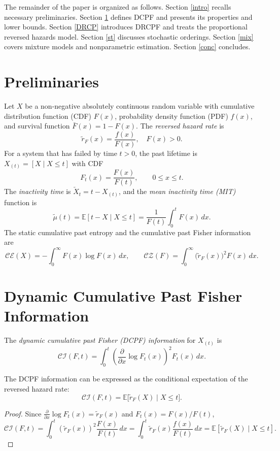 \documentclass[twoside]{article}
\begin{document}
The remainder of the paper is organized as follows. Section \ref{intro} recalls necessary preliminaries. Section \ref{pre} defines DCPF and presents its properties and lower bounds. Section \ref{DRCP} introduces DRCPF and treats the proportional reversed hazards model. Section \ref{st} discusses stochastic orderings. Section \ref{mix} covers mixture models and nonparametric estimation. Section \ref{conc} concludes.



\section{Preliminaries}\label{pre}

Let $X$ be a non‑negative absolutely continuous random variable with cumulative distribution function (CDF) $F(x)$, probability density function (PDF) $f(x)$, and survival function $\bar{F}(x)=1-F(x)$. The \emph{reversed hazard rate} is
$$
\tilde{r}_F(x)=\frac{f(x)}{F(x)},\quad F(x)>0.
$$
For a system that has failed by time $t>0$, the past lifetime is $X_{(t)}=[X\mid X\le t]$ with CDF
$$
F_t(x)=\frac{F(x)}{F(t)},\qquad 0\le x\le t.
$$
The \emph{inactivity time} is $\overleftarrow{X}_t = t-X_{(t)}$, and the \emph{mean inactivity time (MIT)} function is
\begin{equation}
\tilde{\mu}(t)=\mathbb{E}[t-X\mid X\le t]=\frac{1}{F(t)}\int_0^t F(x)\,dx. \tag{1}
\end{equation}
The static cumulative past entropy \cite{di2009cumulative} and the cumulative past Fisher information \cite{balakrishnan2022cumulative} are
$$
\mathcal{CE}(X)=-\int_0^\infty F(x)\log F(x)\,dx,\qquad 
\mathcal{CZ}(F)=\int_0^\infty \bigl(\tilde{r}_F(x)\bigr)^2 F(x)\,dx.
$$
\section{Dynamic Cumulative Past Fisher Information}

\begin{dfn}
	The \emph{dynamic cumulative past Fisher (DCPF) information} for $X_{(t)}$ is
	\begin{equation}
	\mathcal{CI}(F,t)=\int_0^t \left(\frac{\partial}{\partial x}\log F_t(x)\right)^2 F_t(x)\,dx. \tag{2}
	\end{equation}
\end{dfn}

\begin{pro}
	The DCPF information can be expressed as the conditional expectation of the reversed hazard rate:
	\begin{equation}
	\mathcal{CI}(F,t)=\mathbb{E}\bigl[\tilde{r}_F(X)\mid X\le t\bigr]. \tag{3}
	\end{equation}
\end{pro}
\begin{proof}
	Since $\frac{\partial}{\partial x}\log F_t(x)=\tilde{r}_F(x)$ and $F_t(x)=F(x)/F(t)$,
	$$
	\mathcal{CI}(F,t)=\int_0^t (\tilde{r}_F(x))^2\frac{F(x)}{F(t)}\,dx
	=\int_0^t \tilde{r}_F(x)\frac{f(x)}{F(t)}\,dx = \mathbb{E}[\tilde{r}_F(X)\mid X\le t].
	$$
\end{proof}
\end{document}
